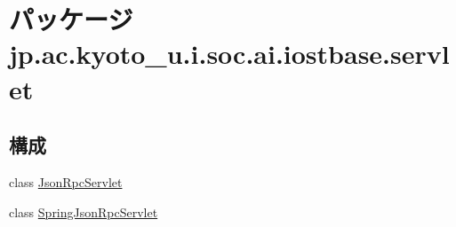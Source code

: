 \hypertarget{namespacejp_1_1ac_1_1kyoto__u_1_1i_1_1soc_1_1ai_1_1iostbase_1_1servlet}{\section{パッケージ jp.\-ac.\-kyoto\-\_\-u.\-i.\-soc.\-ai.\-iostbase.\-servlet}
\label{namespacejp_1_1ac_1_1kyoto__u_1_1i_1_1soc_1_1ai_1_1iostbase_1_1servlet}
}
\subsection*{構成}
\begin{DoxyCompactItemize}
\item 
class \hyperlink{classjp_1_1ac_1_1kyoto__u_1_1i_1_1soc_1_1ai_1_1iostbase_1_1servlet_1_1_json_rpc_servlet}{Json\-Rpc\-Servlet}
\item 
class \hyperlink{classjp_1_1ac_1_1kyoto__u_1_1i_1_1soc_1_1ai_1_1iostbase_1_1servlet_1_1_spring_json_rpc_servlet}{Spring\-Json\-Rpc\-Servlet}
\end{DoxyCompactItemize}
